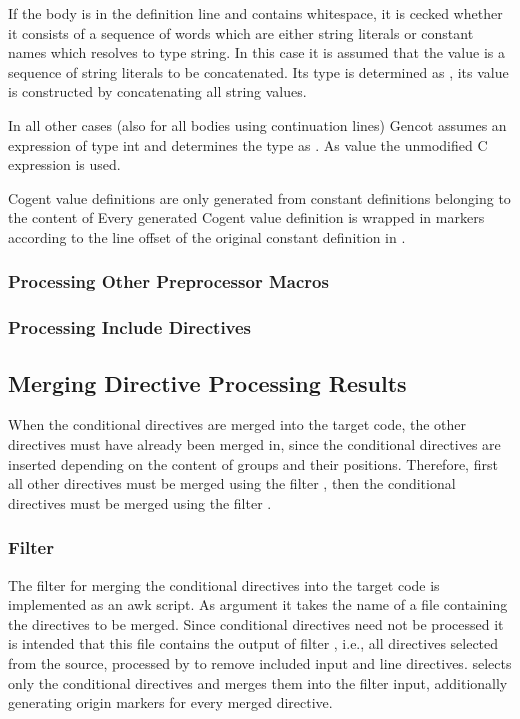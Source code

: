 If the body is in the definition line and contains whitespace, it is cecked whether it consists of a sequence
of words which are either string literals or constant names which resolves to type string. In this case it 
is assumed that the value is a sequence of string literals to be concatenated. Its type is determined as 
, its value is constructed by concatenating all string values.

In all other cases (also for all bodies using continuation lines) Gencot assumes an expression of type int
and determines the type as . As value the unmodified C expression is used.

Cogent value definitions are only generated from constant definitions belonging to the content of 
Every generated Cogent value definition is wrapped in  markers according to the line offset
of the original constant definition in .

\subsubsection{Processing Other Preprocessor Macros}

\subsubsection{Processing Include Directives}

\subsection{Merging Directive Processing Results}

When the conditional directives are merged into the target code, the other 
directives must have already been merged in, since the conditional directives are inserted depending on the content 
of groups and their positions. Therefore, first all other directives must be merged using the filter ,
then the conditional directives must be merged using the filter .

\subsubsection{Filter }

The filter for merging the conditional directives into the target code is implemented as an awk script. As argument
it takes the name of a file containing the directives to be merged. Since conditional directives need not be
processed it is intended that this file contains the output of filter , i.e., all directives
selected from the source, processed by  to remove included input and line directives. 
 selects only the conditional directives and merges them into
the filter input, additionally generating origin markers for every merged directive. 

